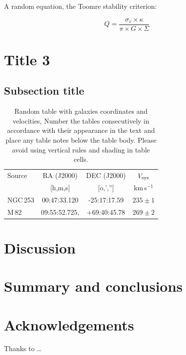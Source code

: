 \documentclass[final,5p,times,twocolumn,authoryear]{elsarticle}
\newcommand{\kms}{km\,s$^{-1}$}
\begin{document}
A random equation, the Toomre stability criterion:

\begin{equation}
	Q = \frac{\sigma_v \times \kappa}{\pi \times G \times \Sigma}
\end{equation}

\section{Title 3}
\lipsum[2]

\subsection{Subsection title}
\lipsum[3]

\begin{table}
	\begin{tabular}{l c c c}
		\midrule
		Source   & RA (J2000)    & DEC (J2000)  & $V_{\rm sys}$ \\
		         & [h,m,s]       & [o,','']     & \kms          \\
		\midrule
		NGC\,253 & 00:47:33.120  & -25:17:17.59 & $235 \pm 1$   \\
		M\,82    & 09:55:52.725, & +69:40:45.78 & $269 \pm 2$   \\
		\midrule
	\end{tabular}
	\caption{Random table with galaxies coordinates and velocities, Number the tables consecutively in
		accordance with their appearance in the text and place any table notes below the table body. Please avoid using vertical rules and shading in table cells.
	}\label{Table1}
\end{table}

\section{Discussion}
\lipsum[4]

\section{Summary and conclusions}
\lipsum[1-4]


\section*{Acknowledgements}
Thanks to \ldots

\appendix
\end{document}
